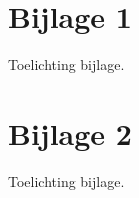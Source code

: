 \begin{appendices}
\section*{Bijlage 1}

Toelichting bijlage.

\lipsum[6-8]

\newpage
\section*{Bijlage 2}

Toelichting bijlage.

\lipsum[16-28]

\end{appendices}